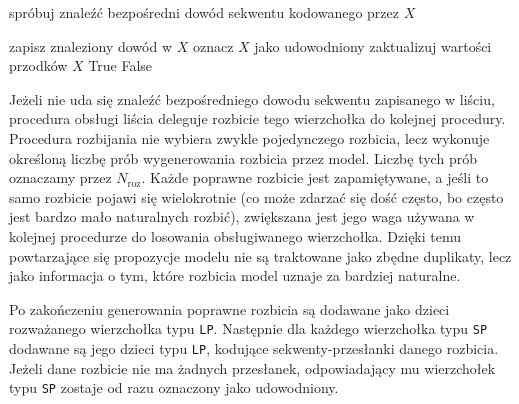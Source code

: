 \documentclass[shortabstract]{iithesis}
\theoremstyle{definition}
\theoremstyle{remark}
\theoremstyle{plain}
\begin{document}
\begin{algorithm}[H]
\caption{Obsługa liścia typu \texttt{LP}}
\label{alg:run-leaf}
\begin{algorithmic}[1]
    \State spróbuj znaleźć bezpośredni dowód sekwentu kodowanego przez $X$

        \State zapisz znaleziony dowód w $X$
        \State oznacz $X$ jako udowodniony
        \State zaktualizuj wartości przodków $X$
        \State \Return True
    \Else
        \State {}
        \State \Return False
    \EndIf
\EndProcedure
\end{algorithmic}
\end{algorithm}

Jeżeli nie uda się znaleźć bezpośredniego dowodu sekwentu zapisanego w liściu,
procedura obsługi liścia deleguje rozbicie tego wierzchołka do kolejnej procedury.
Procedura rozbijania nie wybiera zwykle pojedynczego rozbicia, lecz wykonuje
określoną liczbę prób wygenerowania rozbicia przez model. Liczbę tych prób
oznaczamy przez \(N_{\mathrm{roz}}\). Każde poprawne rozbicie jest zapamiętywane,
a jeśli to samo rozbicie pojawi się wielokrotnie (co może zdarzać się dość często, bo często jest
bardzo mało naturalnych rozbić), zwiększana jest jego waga używana w kolejnej procedurze do losowania obsługiwanego wierzchołka. Dzięki
temu powtarzające się propozycje modelu nie są traktowane jako zbędne duplikaty,
lecz jako informacja o tym, które rozbicia model uznaje za bardziej naturalne.

Po zakończeniu generowania poprawne rozbicia są dodawane jako dzieci rozważanego
wierzchołka typu \texttt{LP}. Następnie dla każdego wierzchołka typu \texttt{SP}
dodawane są jego dzieci typu \texttt{LP}, kodujące sekwenty-przesłanki danego
rozbicia. Jeżeli dane rozbicie nie ma żadnych przesłanek, odpowiadający mu
wierzchołek typu \texttt{SP} zostaje od razu oznaczony jako udowodniony.
\end{document}
